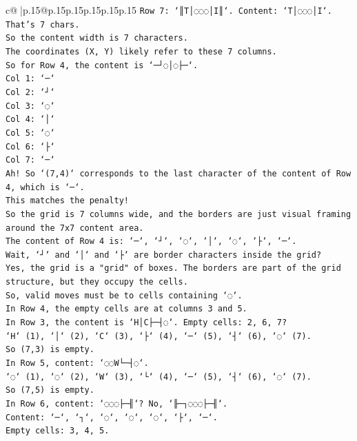 \documentclass{article}
\begin{document}
{\begin{supertabular}{c@{$\;$}|p{.15\linewidth}@{}p{.15\linewidth}p{.15\linewidth}p{.15\linewidth}p{.15\linewidth}p{.15\linewidth}}
{{{\texttt{Row 7: `║T│◌◌◌│I║`. Content: `T│◌◌◌│I`. That's 7 chars.} \\
\texttt{So the content width is 7 characters.} \\
\texttt{The coordinates (X, Y) likely refer to these 7 columns.} \\
\texttt{So for Row 4, the content is `─┘◌│◌├─`.} \\
\texttt{Col 1: `─`} \\
\texttt{Col 2: `┘`} \\
\texttt{Col 3: `◌`} \\
\texttt{Col 4: `│`} \\
\texttt{Col 5: `◌`} \\
\texttt{Col 6: `├`} \\
\texttt{Col 7: `─`} \\
\texttt{Ah! So `(7,4)` corresponds to the last character of the content of Row 4, which is `─`.} \\
\texttt{This matches the penalty!} \\
\texttt{So the grid is 7 columns wide, and the borders are just visual framing around the 7x7 content area.} \\
\texttt{The content of Row 4 is: `─`, `┘`, `◌`, `│`, `◌`, `├`, `─`.} \\
\texttt{Wait, `┘` and `│` and `├` are border characters inside the grid?} \\
\texttt{Yes, the grid is a "grid" of boxes. The borders are part of the grid structure, but they occupy the cells.} \\
\texttt{So, valid moves must be to cells containing `◌`.} \\
\texttt{In Row 4, the empty cells are at columns 3 and 5.} \\
\texttt{In Row 3, the content is `H│C├─┤◌`. Empty cells: 2, 6, 7?} \\
\texttt{`H` (1), `│` (2), `C` (3), `├` (4), `─` (5), `┤` (6), `◌` (7).} \\
\texttt{So (7,3) is empty.} \\
\texttt{In Row 5, content: `◌◌W└─┤◌`.} \\
\texttt{`◌` (1), `◌` (2), `W` (3), `└` (4), `─` (5), `┤` (6), `◌` (7).} \\
\texttt{So (7,5) is empty.} \\
\texttt{In Row 6, content: `◌◌◌├─╢`? No, `╟─┐◌◌◌├─╢`.} \\
\texttt{Content: `─`, `┐`, `◌`, `◌`, `◌`, `├`, `─`.} \\
\texttt{Empty cells: 3, 4, 5.} \\
}}}
\end{supertabular}}
\end{document}
